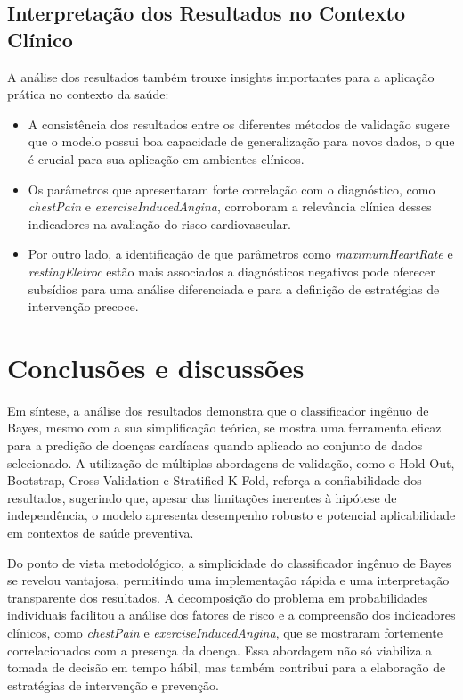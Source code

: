 \documentclass[conference]{IEEEtran}
\begin{document}
\subsection{Interpretação dos Resultados no Contexto Clínico}
A análise dos resultados também trouxe insights importantes para a aplicação prática no contexto da saúde:
\begin{itemize}
    \item A consistência dos resultados entre os diferentes métodos de validação sugere que o modelo possui boa capacidade de generalização para novos dados, o que é crucial para sua aplicação em ambientes clínicos.
    \item Os parâmetros que apresentaram forte correlação com o diagnóstico, como \textit{chestPain} e \textit{exerciseInducedAngina}, corroboram a relevância clínica desses indicadores na avaliação do risco cardiovascular.
    \item Por outro lado, a identificação de que parâmetros como \textit{maximumHeartRate} e \textit{restingEletroc} estão mais associados a diagnósticos negativos pode oferecer subsídios para uma análise diferenciada e para a definição de estratégias de intervenção precoce.
\end{itemize}

\section{Conclusões e discussões}
Em síntese, a análise dos resultados demonstra que o classificador ingênuo de Bayes, mesmo com a sua simplificação teórica, se mostra uma ferramenta eficaz para a predição de doenças cardíacas quando aplicado ao conjunto de dados selecionado. A utilização de múltiplas abordagens de validação, como o Hold-Out, Bootstrap, Cross Validation e Stratified K-Fold, reforça a confiabilidade dos resultados, sugerindo que, apesar das limitações inerentes à hipótese de independência, o modelo apresenta desempenho robusto e potencial aplicabilidade em contextos de saúde preventiva.

Do ponto de vista metodológico, a simplicidade do classificador ingênuo de Bayes se revelou vantajosa, permitindo uma implementação rápida e uma interpretação transparente dos resultados. A decomposição do problema em probabilidades individuais facilitou a análise dos fatores de risco e a compreensão dos indicadores clínicos, como \textit{chestPain} e \textit{exerciseInducedAngina}, que se mostraram fortemente correlacionados com a presença da doença. Essa abordagem não só viabiliza a tomada de decisão em tempo hábil, mas também contribui para a elaboração de estratégias de intervenção e prevenção.
\end{document}
